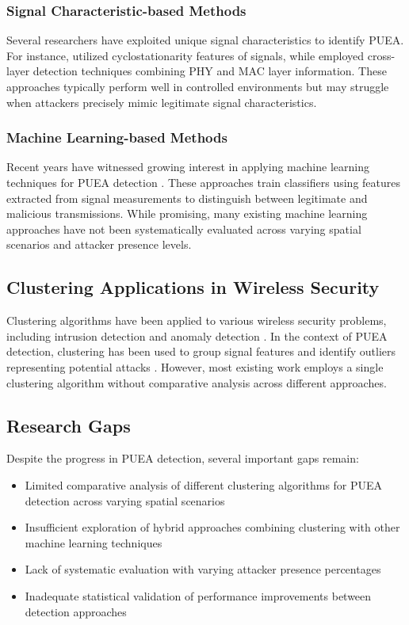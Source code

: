 \documentclass[conference]{IEEEtran}
\begin{document}
\subsubsection{Signal Characteristic-based Methods}
Several researchers have exploited unique signal characteristics to identify PUEA. For instance, \cite{jin2010cyclostationarity} utilized cyclostationarity features of signals, while \cite{huang2013cross} employed cross-layer detection techniques combining PHY and MAC layer information. These approaches typically perform well in controlled environments but may struggle when attackers precisely mimic legitimate signal characteristics.

\subsubsection{Machine Learning-based Methods}
Recent years have witnessed growing interest in applying machine learning techniques for PUEA detection \cite{wang2018deep, kim2018machine}. These approaches train classifiers using features extracted from signal measurements to distinguish between legitimate and malicious transmissions. While promising, many existing machine learning approaches have not been systematically evaluated across varying spatial scenarios and attacker presence levels.

\subsection{Clustering Applications in Wireless Security}

Clustering algorithms have been applied to various wireless security problems, including intrusion detection \cite{shah2018clustering} and anomaly detection \cite{rajendran2019secure}. In the context of PUEA detection, clustering has been used to group signal features and identify outliers representing potential attacks \cite{luo2019clustering}. However, most existing work employs a single clustering algorithm without comparative analysis across different approaches.

\subsection{Research Gaps}

Despite the progress in PUEA detection, several important gaps remain:

\begin{itemize}
    \item Limited comparative analysis of different clustering algorithms for PUEA detection across varying spatial scenarios
    \item Insufficient exploration of hybrid approaches combining clustering with other machine learning techniques
    \item Lack of systematic evaluation with varying attacker presence percentages
    \item Inadequate statistical validation of performance improvements between detection approaches
\end{itemize}
\end{document}

